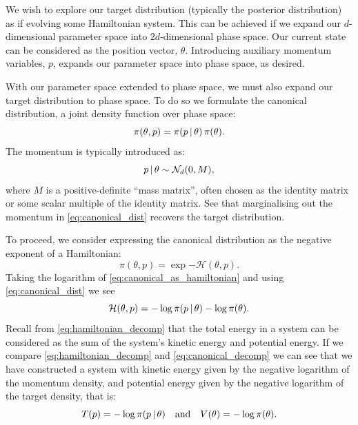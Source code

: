 We wish to explore our target distribution (typically the posterior
distribution) as if evolving some Hamiltonian system. This can be achieved if
we expand our $d$-dimensional parameter space into $2d$-dimensional phase
space. Our current state can be considered as the position vector, $\theta$.
Introducing auxiliary momentum variables, $p$, expands our parameter space into
phase space, as desired.

With our parameter space extended to phase space, we must also expand our
target distribution to phase space. To do so we formulate the canonical
distribution, a joint density function over phase space:
\begin{equation}
  \label{eq:canonical_dist}
  \pi(\theta, p) = \pi(p \,|\,\theta) \, \pi(\theta).
\end{equation}
The momentum is typically introduced as:
\begin{equation}
  p \,|\, \theta \sim \mathcal{N}_d(0, M),
\end{equation}
where $M$ is a positive-definite ``mass matrix'', often chosen as the identity
matrix or some scalar multiple of the identity matrix. See that marginalising
out the momentum in \cref{eq:canonical_dist} recovers the target distribution.

To proceed, we consider expressing the canonical distribution as the negative
exponent of a Hamiltonian:
\begin{equation}
  \label{eq:canonical_as_hamiltonian}
  \pi(\theta, p) = \exp{-\mathcal{H}(\theta, p)}.
\end{equation}
Taking the logarithm of \cref{eq:canonical_as_hamiltonian} and using
\cref{eq:canonical_dist} we see
\begin{equation}
  \label{eq:canonical_decomp}
  \mathcal{H}(\theta, p) = -\log{\pi(p \,|\,\theta)} - \log{\pi(\theta)}.
\end{equation}
Recall from \cref{eq:hamiltonian_decomp} that the total energy in a system can
be considered as the sum of the system's kinetic energy and potential energy.
If we compare \cref{eq:hamiltonian_decomp} and \cref{eq:canonical_decomp} we
can see that we have constructed a system with kinetic energy given by the
negative logarithm of the momentum density, and potential energy given by the
negative logarithm of the target density, that is:
\begin{equation*}
    T(p) = -\log{\pi(p \,|\,\theta)} \quad\text{and}\quad V(\theta) = -\log{\pi(\theta)}.
\end{equation*}

